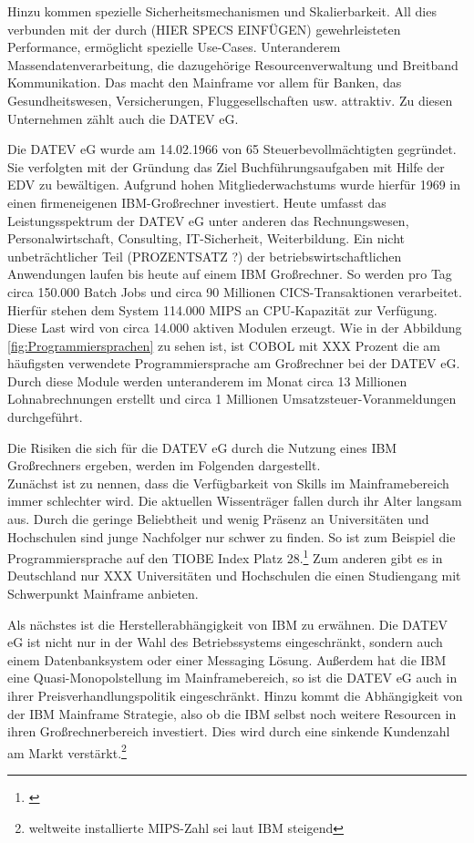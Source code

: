 Hinzu kommen spezielle Sicherheitsmechanismen und Skalierbarkeit.
All dies verbunden mit der durch (HIER SPECS EINFÜGEN) gewehrleisteten Performance, ermöglicht spezielle Use-Cases.
Unteranderem Massendatenverarbeitung, die dazugehörige Resourcenverwaltung und Breitband Kommunikation.
Das macht den Mainframe vor allem für Banken, das Gesundheitswesen, Versicherungen, Fluggesellschaften usw. attraktiv.
Zu diesen Unternehmen zählt auch die DATEV eG.
\cite{IBM.2014}

Die DATEV eG wurde am 14.02.1966 von 65 Steuerbevollmächtigten gegründet.
Sie verfolgten mit der Gründung das Ziel Buchführungsaufgaben mit Hilfe der EDV zu bewältigen.
Aufgrund hohen Mitgliederwachstums wurde hierfür 1969 in einen firmeneigenen IBM-Großrechner investiert.\cite{DATEVeG.2017}
Heute umfasst das Leistungsspektrum der DATEV eG unter anderen das Rechnungswesen, Personalwirtschaft, Consulting, IT-Sicherheit, Weiterbildung.
Ein nicht unbeträchtlicher Teil (PROZENTSATZ ?) der betriebswirtschaftlichen Anwendungen laufen bis heute auf einem IBM Großrechner.
So werden pro Tag circa 150.000 Batch Jobs und circa 90 Millionen CICS-Transaktionen verarbeitet.
Hierfür stehen dem System 114.000 MIPS an CPU-Kapazität zur Verfügung.
Diese Last wird von circa 14.000 aktiven Modulen erzeugt.
Wie in der Abbildung \ref{fig:Programmiersprachen} zu sehen ist, ist COBOL mit XXX Prozent die am häufigsten verwendete Programmiersprache am Großrechner bei der DATEV eG.
Durch diese Module werden unteranderem im Monat circa 13 Millionen Lohnabrechnungen erstellt und circa 1 Millionen Umsatzsteuer-Voranmeldungen durchgeführt.

Die Risiken die sich für die DATEV eG durch die Nutzung eines IBM Großrechners ergeben, werden im Folgenden dargestellt.\\
Zunächst ist zu nennen, dass die Verfügbarkeit von Skills im Mainframebereich immer schlechter wird.
Die aktuellen Wissenträger fallen durch ihr Alter langsam aus.
Durch die geringe Beliebtheit und wenig Präsenz an Universitäten und Hochschulen sind junge Nachfolger nur schwer zu finden.
So ist zum Beispiel die Programmiersprache auf den TIOBE Index Platz 28.\footnote{\cite{TIOBESoftwareBV.25.11.2019}}
Zum anderen gibt es in Deutschland nur XXX Universitäten und Hochschulen die einen Studiengang mit Schwerpunkt Mainframe anbieten.\cite{fehlt noch}

Als nächstes ist die Herstellerabhängigkeit von IBM zu erwähnen.
Die DATEV eG ist nicht nur in der Wahl des Betriebssystems eingeschränkt, sondern auch einem Datenbanksystem oder einer Messaging Lösung.
Außerdem hat die IBM eine Quasi-Monopolstellung\cite{fehlt noch} im Mainframebereich, so ist die DATEV eG auch in ihrer Preisverhandlungspolitik eingeschränkt.
Hinzu kommt die Abhängigkeit von der IBM Mainframe Strategie, also ob die IBM selbst noch weitere Resourcen in ihren Großrechnerbereich investiert.
Dies wird durch eine sinkende Kundenzahl am Markt verstärkt.\footnote{weltweite installierte MIPS-Zahl sei laut IBM steigend}

